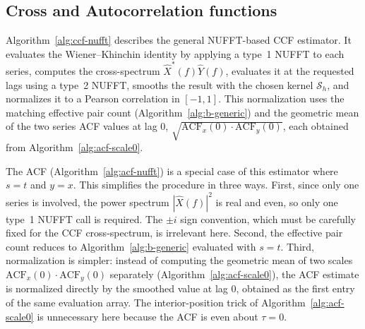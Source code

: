 \documentclass[twocolumn,10pt]{article}
\begin{document}
\subsection{Cross and Autocorrelation functions}
%
Algorithm~\ref{alg:ccf-nufft} describes the general NUFFT-based CCF estimator.
It evaluates the Wiener--Khinchin identity by applying a type~1 NUFFT to each series,
computes the cross-spectrum $\hat X^\ast(f)\hat Y(f)$,
evaluates it at the requested lags using a type~2 NUFFT,
smooths the result with the chosen kernel $\mathcal{S}_h$,
and normalizes it to a Pearson correlation in $[-1,1]$.
This normalization uses the matching effective pair count (Algorithm~\ref{alg:b-generic})
and the geometric mean of the two series ACF values at lag $0$,
$\sqrt{\mathrm{ACF}_x(0)\cdot\mathrm{ACF}_y(0)}$,
each obtained from Algorithm~\ref{alg:acf-scale0}.

The ACF (Algorithm~\ref{alg:acf-nufft}) is a special case of this estimator where $s=t$ and $y=x$.
	This simplifies the procedure in three ways.
First, since only one series is involved, the power spectrum $|\hat X(f)|^2$ is real and even,
so only one type~1 NUFFT call is required.
The $\pm i$ sign convention, which must be carefully fixed for the CCF cross-spectrum, is irrelevant here.
Second, the effective pair count reduces to Algorithm~\ref{alg:b-generic} evaluated with $s=t$.
Third, normalization is simpler: instead of computing the geometric mean of two scales
$\mathrm{ACF}_x(0)\cdot\mathrm{ACF}_y(0)$ separately (Algorithm~\ref{alg:acf-scale0}),
the ACF estimate is normalized directly by the smoothed value at lag $0$,
obtained as the first entry of the same evaluation array.
The interior-position trick of Algorithm~\ref{alg:acf-scale0} is unnecessary here because the ACF is even about $\tau=0$.
\end{document}
